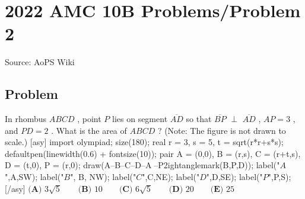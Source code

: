 \documentclass[12pt]{article}
\begin{document}
\section*{{2022 AMC 10B Problems/Problem 2}}
Source: AoPS Wiki

\subsection*{Problem}
In rhombus $ABCD$ , point $P$ lies on segment $\overline{AD}$ so that $\overline{BP}$ $\perp$ $\overline{AD}$ , $AP = 3$ , and $PD = 2$ . What is the area of $ABCD$ ? (Note: The figure is not drawn to scale.) [asy] import olympiad; size(180); real r = 3, s = 5, t = sqrt(r*r+s*s); defaultpen(linewidth(0.6) + fontsize(10)); pair A = (0,0), B = (r,s), C = (r+t,s), D = (t,0), P = (r,0); draw(A--B--C--D--A^^B--P^^rightanglemark(B,P,D)); label("$A$",A,SW); label("$B$", B, NW); label("$C$",C,NE); label("$D$",D,SE); label("$P$",P,S); [/asy] $\textbf{(A) }3\sqrt 5 \qquad \textbf{(B) }10 \qquad \textbf{(C) }6\sqrt 5 \qquad \textbf{(D) }20\qquad \textbf{(E) }25$
\end{document}
